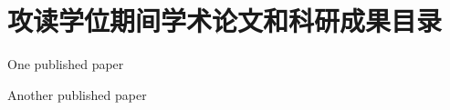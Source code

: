 \newpage
{}
{}
\section*{攻读学位期间学术论文和科研成果目录}
\begin{enumerate}[label = {[\textbf{\arabic*}]}]
    \item {One published paper}
    \item {Another published paper}
    
\end{enumerate}

